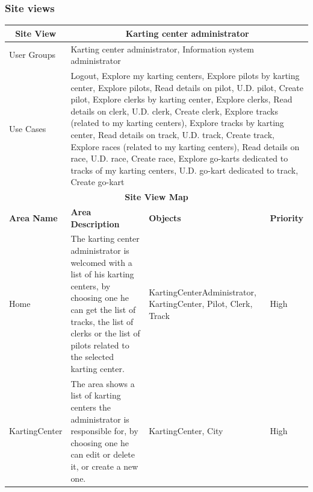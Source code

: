 \documentclass{beamer}
\begin{document}
\begin{frame}
    \frametitle{Site views}
    \begin{table}
        \centering
        \tiny
        \setlength{\tabcolsep}{1pt}
        \begin{tabular}{|m{2cm}|m{4cm}|m{3cm}|m{1cm}|}
        \hline
        \multicolumn{1}{|c|}{\textbf{Site View}} & \multicolumn{3}{c|}{\textbf{Karting center administrator}} \\
        \hline
        User Groups & \multicolumn{3}{m{8cm}|}{Karting center administrator, Information system administrator} \\
        \hline
        Use Cases & \multicolumn{3}{m{8cm}|}{Logout, Explore my karting centers, 
        Explore pilots by karting center, Explore pilots, Read details on pilot, U.D. pilot, 
        Create pilot, Explore clerks by karting center, Explore clerks, Read details on clerk, 
        U.D. clerk, Create clerk, Explore tracks (related to my karting centers), 
        Explore tracks by karting center, Read details on track, U.D. track, 
        Create track, Explore races (related to my karting centers), Read details on race, 
        U.D. race, Create race, Explore go-karts dedicated to tracks of my karting centers, 
        U.D. go-kart dedicated to track, Create go-kart} \\
        \hline
        \multicolumn{4}{|c|}{\textbf{Site View Map}} \\
        \hline
        \textbf{Area Name} & \textbf{Area Description} & \textbf{Objects} & \textbf{Priority} \\
        \hline
        Home & The karting center administrator is welcomed with a list of his karting centers,
        by choosing one he can get the list of tracks, the list of clerks or the list of pilots
        related to the selected karting center.
         & KartingCenterAdministrator, KartingCenter, Pilot, Clerk, Track & High \\
        \hline
        KartingCenter & The area shows a list of karting centers the administrator is responsible for,
        by choosing one he can edit or delete it, or create a new one.
         & KartingCenter, City & High \\
        \hline
        \end{tabular}
    \end{table}
\end{frame}
\end{document}
